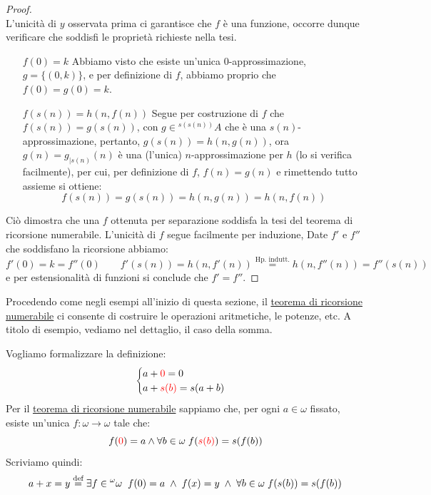 \begin{proof}
\[		\]
	L'unicità di $y$ osservata prima ci garantisce che $f$ è una funzione, occorre dunque verificare che soddisfi le proprietà richieste nella tesi.
	\begin{itemize}
		\item[$\boxed{f(0) = k}$] Abbiamo visto che esiste un'unica 0-approssimazione, $g = \{(0,k)\}$, e per definizione di $f$, abbiamo proprio che $f(0) = g(0) = k$.
		\item[$\boxed{f(s(n)) = h(n,f(n))}$] Segue per costruzione di $f$ che $f(s(n)) = g(s(n))$, con $g \in {}^{s(s(n))}A$ che è una $s(n)$-approssimazione, pertanto, $g(s(n)) = h(n,g(n))$,
		ora $g(n) = g_{|s(n)}(n)$ è una (l'unica) $n$-approssimazione per $h$ (lo si verifica facilmente), per cui, per definizione di $f$, $f(n) = g(n)$ e rimettendo tutto assieme si ottiene:
		\[ f(s(n)) = g(s(n)) = h(n,g(n)) = h(n,f(n))
			\]
	\end{itemize}
	Ciò dimostra che una $f$ ottenuta per separazione soddisfa la tesi del teorema di ricorsione numerabile.
	L'unicità di $f$ segue facilmente per induzione, Date $f'$ e $f''$ che soddisfano la ricorsione abbiamo:
	\[ f'(0) = k = f''(0) \qquad f'(s(n)) = h(n,f'(n)) \overset{\text{Hp. indutt.}}{=} h(n,f''(n)) = f''(s(n))
		\]
	e per estensionalità di funzioni si conclude che $f' = f''$.
\end{proof}

Procedendo come negli esempi all'inizio di questa sezione, il \hyperref[ric1]{teorema di ricorsione numerabile} ci consente di costruire le operazioni aritmetiche, le potenze, etc.
A titolo di esempio, vediamo nel dettaglio, il caso della somma.

\begin{example}
	Vogliamo formalizzare la definizione:
	\[ \begin{cases}
		a + \textcolor{red}{0} = 0\\
		a + \textcolor{red}{s(b)} = s(a+b)
	\end{cases}
		\]
	Per il \hyperref[ric1]{teorema di ricorsione numerabile} sappiamo che, per ogni $a \in \omega$ fissato, esiste un'unica $f : \omega \rightarrow \omega$ tale che:
	\[ f(\textcolor{red}{0}) = a \land \forall b \in \omega \; f(\textcolor{red}{s(b)}) = s(f(b))
		\]
	Scriviamo quindi:
	\[ a + x = y \overset{\text{def}}{=} \exists f \in {}^{\omega}\omega \;\; f(0) = a \; \land  \; f(x) = y \; \land \; \forall b \in \omega \; f(s(b)) = s(f(b))
		\]
\end{example}

